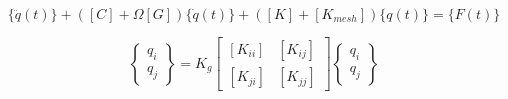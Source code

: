 \documentclass[10pt,fleqn,a4paper,twoside]{article}
\begin{document}
	\begin{equation}
		[M]\{\ddot{q}(t)\}+([C]+\Omega [G])\{\dot{q}(t)\}+([K] + [K_{mesh}])\{q(t)\}=\{F(t)\}
		\label{Eq:mov-alt}
	\end{equation}
	
	\begin{equation}
		[K_{mesh}]
		\begin{Bmatrix}
			q_i \\
			q_j
		\end{Bmatrix}
		= K_{g}
		\begin{bmatrix}
			[K_{ii}] & [K_{ij}] \\
			[K_{ji}] & [K_{jj}]
		\end{bmatrix}
		\begin{Bmatrix}
			q_i \\
			q_j
		\end{Bmatrix}
		\label{Eq:k_mesh}
	\end{equation}
	
\end{document}
